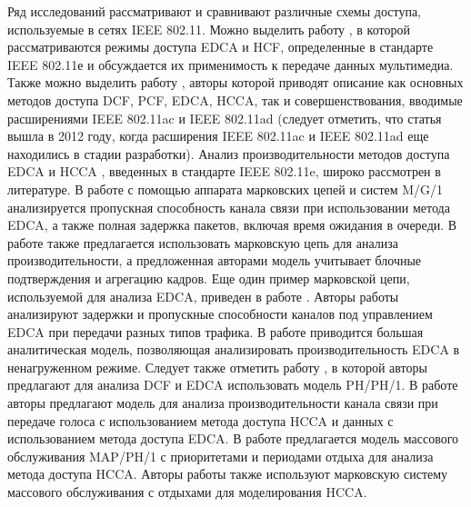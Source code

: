 
Ряд исследований рассматривают и сравнивают различные схемы доступа, используемые в сетях IEEE 802.11. Можно выделить работу \cite{Gao2005}, в которой рассматриваются режимы доступа EDCA и HCF, определенные в стандарте IEEE 802.11е и обсуждается их применимость к передаче данных мультимедиа. Также можно выделить работу \cite{Charfi2012}, авторы которой приводят описание как основных методов доступа DCF, PCF, EDCA, HCCA, так и совершенствования, вводимые расширениями IEEE 802.11ac и IEEE 802.11ad (следует отметить, что статья вышла в 2012 году, когда расширения IEEE 802.11ac и IEEE 802.11ad еще находились в стадии разработки). Анализ производительности методов доступа EDCA \cite{Engelstad2006, Hazra2011, Kong2004, Liu2007, Inan2009, Misic2012, YanfengZhu2006} и HCCA \cite{Harsha2006, Ghazizadeh2009, Rashd2006}, введенных в стандарте IEEE 802.11e, широко рассмотрен в литературе. В работе \cite{Engelstad2006} с помощью аппарата марковских цепей и систем M/G/1 анализируется пропускная способность канала связи при использовании метода EDCA, а также полная задержка пакетов, включая время ожидания в очереди. В работе \cite{Hazra2011} также предлагается использовать марковскую цепь для анализа производительности, а предложенная авторами модель учитывает блочные подтверждения и агрегацию кадров. Еще один пример марковской цепи, используемой для анализа EDCA, приведен в работе \cite{Kong2004}. Авторы работы \cite{Liu2007} анализируют задержки и пропускные способности каналов под управлением EDCA при передачи разных типов трафика. В работе \cite{Misic2012} приводится большая аналитическая модель, позволяющая анализировать производительность EDCA в ненагруженном режиме. Следует также отметить работу \cite{YanfengZhu2006}, в которой авторы предлагают для анализа DCF и EDCA использовать модель PH/PH/1. В работе \cite{Harsha2006} авторы предлагают модель для анализа производительности канала связи при передаче голоса с использованием метода доступа HCCA и данных с использованием метода доступа EDCA. В работе \cite{Ghazizadeh2009} предлагается модель массового обслуживания MAP/PH/1 с приоритетами и периодами отдыха для анализа метода доступа HCCA.  Авторы работы \cite{Rashd2006} также используют марковскую систему массового обслуживания с отдыхами для моделирования HCCA.


